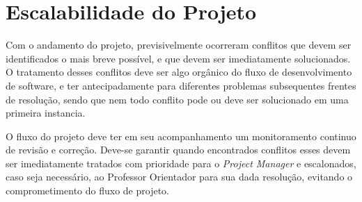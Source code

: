 \documentclass[
	12pt,				%
	oneside,			%
	a4paper,			%
	english,			%
	brazil,				%
	]{abntex2}
\begin{document}
\section{Escalabilidade do Projeto}

Com o andamento do projeto, previsivelmente ocorreram conflitos que devem ser identificados o mais breve possível, e que devem ser imediatamente solucionados. O tratamento desses conflitos deve ser algo orgânico do fluxo de desenvolvimento de software, e ter antecipadamente para diferentes problemas subsequentes frentes de resolução, sendo que nem todo conflito pode ou deve ser solucionado em uma primeira instancia.

O fluxo do projeto deve ter em seu acompanhamento um monitoramento continuo de revisão e correção. Deve-se garantir quando encontrados conflitos esses devem ser imediatamente tratados com prioridade para o \textit{Project Manager} e escalonados, caso seja necessário, ao Professor Orientador para sua dada resolução, evitando o comprometimento do fluxo de projeto.
\end{document}
